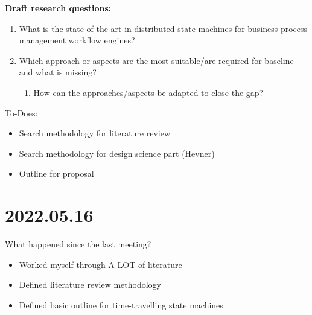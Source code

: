 \textbf{Draft research questions:}
\begin{enumerate}
\item What is the state of the art in distributed state machines for business process management workflow engines?
\item Which approach or aspects are the most suitable/are required for baseline and what is missing?
  \begin{enumerate}
  \item How can the approaches/aspects be adapted to close the gap?
  \end{enumerate}
\end{enumerate}


To-Does:
\begin{itemize}
\item Search methodology for literature review
\item Search methodology for design science part (Hevner)
\item Outline for proposal
\end{itemize}


\section{2022.05.16}
What happened since the last meeting?
\begin{itemize}
    \item Worked myself through A LOT of literature
    \item Defined literature review methodology
    \item Defined basic outline for time-travelling state machines
\end{itemize}

